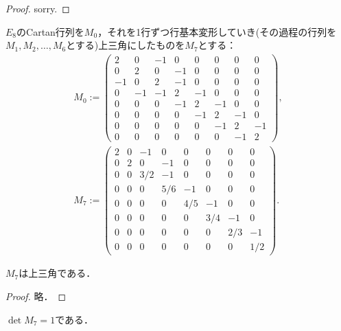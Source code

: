 \begin{proof}
  sorry.
\end{proof}

\begin{defi}
  \label{defi:M0-M7}
  \leanok
  $E_8$のCartan行列を$M_0$，それを1行ずつ行基本変形していき(その過程の行列を$M_1, M_2, \ldots, M_6$とする)上三角にしたものを$M_7$とする：
  \begin{gather}
    M_0 :=
    \begin{pmatrix}
      2 & 0 & -1 & 0 & 0 & 0 & 0 & 0 \\
      0 & 2 & 0 & -1 & 0 & 0 & 0 & 0 \\
      -1 & 0 & 2 & -1 & 0 & 0 & 0 & 0 \\
      0 & -1 & -1 & 2 & -1 & 0 & 0 & 0 \\
      0 & 0 & 0 & -1 & 2 & -1 & 0 & 0 \\
      0 & 0 & 0 & 0 & -1 & 2 & -1 & 0 \\
      0 & 0 & 0 & 0 & 0 & -1 & 2 & -1 \\
      0 & 0 & 0 & 0 & 0 & 0 & -1 & 2
    \end{pmatrix},\\
    M_7 :=
    \begin{pmatrix}
      2 & 0 & -1 & 0 & 0 & 0 & 0 & 0 \\
      0 & 2 & 0 & -1 & 0 & 0 & 0 & 0 \\
      0 & 0 & 3/2 & -1 & 0 & 0 & 0 & 0 \\
      0 & 0 & 0 & 5/6 & -1 & 0 & 0 & 0 \\
      0 & 0 & 0 & 0 & 4/5 & -1 & 0 & 0 \\
      0 & 0 & 0 & 0 & 0 & 3/4 & -1 & 0 \\
      0 & 0 & 0 & 0 & 0 & 0 & 2/3 & -1 \\
      0 & 0 & 0 & 0 & 0 & 0 & 0 & 1/2
    \end{pmatrix}.
  \end{gather}
\end{defi}

\begin{lem}
  \label{lem:M7_upperTrianglar}
  \leanok
  $M_7$は上三角である．
\end{lem}

\begin{proof}
  \leanok
  略．
\end{proof}

\begin{lem}
  \label{lem:M7_det}
  \leanok
  $\det M_7 = 1$である．
\end{lem}

